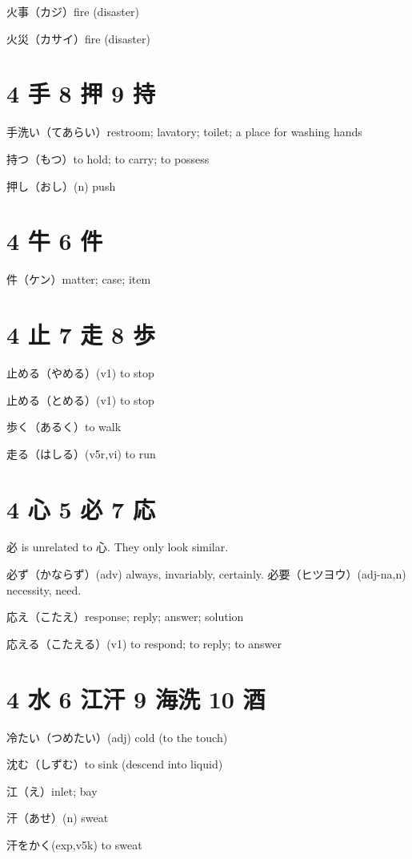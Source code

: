 火事（カジ）fire (disaster)

火災（カサイ）fire (disaster)

\section{4 手 8 押 9 持}

手洗い（てあらい）restroom; lavatory; toilet; a place for washing hands

持つ（もつ）to hold; to carry; to possess

押し（おし）(n) push

\section{4 牛 6 件}

件（ケン）matter; case; item

\section{4 止 7 走 8 歩}

止める（やめる）(v1) to stop

止める（とめる）(v1) to stop

歩く（あるく）to walk

走る（はしる）(v5r,vi) to run

\section{4 心 5 必 7 応}

必 is unrelated to 心. They only look similar.

必ず（かならず）(adv) always, invariably, certainly.
必要（ヒツヨウ）(adj-na,n) necessity, need.

応え（こたえ）response; reply; answer; solution

応える（こたえる）(v1) to respond; to reply; to answer

\section{4 水 6 江汗 9 海洗 10 酒}

冷たい（つめたい）(adj) cold (to the touch)

沈む（しずむ）to sink (descend into liquid)

江（え）inlet; bay

汗（あせ）(n) sweat

汗をかく(exp,v5k) to sweat

